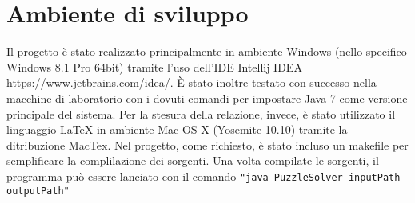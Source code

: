 %
%

\section{Ambiente di sviluppo}
Il progetto \`{e} stato realizzato principalmente in ambiente Windows (nello specifico Windows 8.1 Pro 64bit) tramite l'uso dell'IDE Intellij IDEA \url{https://www.jetbrains.com/idea/}. \`{E} stato inoltre testato con successo nella macchine di laboratorio con i dovuti comandi per impostare Java 7 come versione principale del sistema.
Per la stesura della relazione, invece, \`{e} stato utilizzato il linguaggio \LaTeX{} in ambiente Mac OS X (Yosemite 10.10) tramite la ditribuzione MacTex.
Nel progetto, come richiesto, \`{e} stato incluso un makefile per semplificare la complilazione dei sorgenti. Una volta compilate le sorgenti, il programma può essere lanciato con il  comando \texttt{"java PuzzleSolver inputPath outputPath"}
